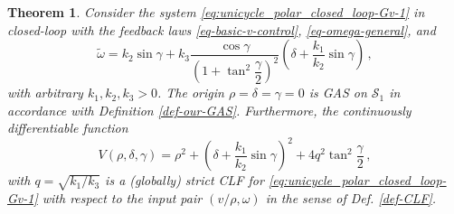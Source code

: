 \documentclass[letterpaper, 10 pt, conference]{ieeeconf}  %
\newtheorem{theorem}{Theorem}
\begin{document}
\begin{theorem}
\label{thm:CLF_BoFo}
Consider the system \eqref{eq:unicycle_polar_closed_loop-Gv-1} in closed-loop with the feedback laws \eqref{eq-basic-v-control}, \eqref{eq-omega-general}, and 
\begin{equation}
\label{eq:BoFo}
\tilde\omega = k_2\sin\gamma + k_3\dfrac{\cos\gamma}{\left(1 + \tan^2 \dfrac{\gamma}{2}\right)^2}
\left(\delta + \dfrac{k_1}{k_2}\sin\gamma \right)\,,
\end{equation}
with arbitrary $k_1, k_2, k_3 > 0$.
The origin $\rho = \delta = \gamma = 0$ is GAS on $\mathcal{S}_1$ in accordance with Definition \ref{def-our-GAS}.
Furthermore, the continuously differentiable function
\begin{equation}
V(\rho,\delta, \gamma)  = 
\rho^2 + \left(\delta + \frac{k_1}{k_2} \sin \gamma \right)^2+ 4q^2 \tan ^2\frac{\gamma}{2} 
\,,  \label{eq:CLF_BoFo_gamma_delta}
\end{equation}
with $q = \sqrt{k_1/k_3}$ is a (globally) strict CLF for \eqref{eq:unicycle_polar_closed_loop-Gv-1} with respect to the input pair $(v/\rho,\omega)$ in the sense of Def. \ref{def-CLF}. 
\end{theorem}
\end{document}
